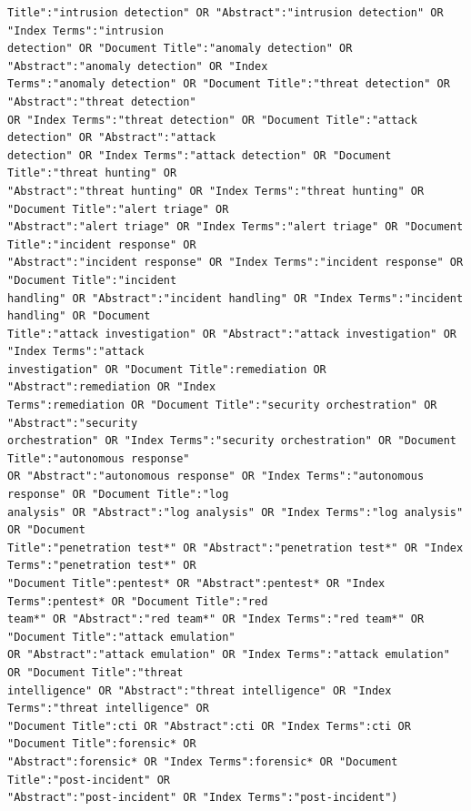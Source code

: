 \begin{lstlisting}
Title":"intrusion detection" OR "Abstract":"intrusion detection" OR "Index Terms":"intrusion
detection" OR "Document Title":"anomaly detection" OR "Abstract":"anomaly detection" OR "Index
Terms":"anomaly detection" OR "Document Title":"threat detection" OR "Abstract":"threat detection"
OR "Index Terms":"threat detection" OR "Document Title":"attack detection" OR "Abstract":"attack
detection" OR "Index Terms":"attack detection" OR "Document Title":"threat hunting" OR
"Abstract":"threat hunting" OR "Index Terms":"threat hunting" OR "Document Title":"alert triage" OR
"Abstract":"alert triage" OR "Index Terms":"alert triage" OR "Document Title":"incident response" OR
"Abstract":"incident response" OR "Index Terms":"incident response" OR "Document Title":"incident
handling" OR "Abstract":"incident handling" OR "Index Terms":"incident handling" OR "Document
Title":"attack investigation" OR "Abstract":"attack investigation" OR "Index Terms":"attack
investigation" OR "Document Title":remediation OR "Abstract":remediation OR "Index
Terms":remediation OR "Document Title":"security orchestration" OR "Abstract":"security
orchestration" OR "Index Terms":"security orchestration" OR "Document Title":"autonomous response"
OR "Abstract":"autonomous response" OR "Index Terms":"autonomous response" OR "Document Title":"log
analysis" OR "Abstract":"log analysis" OR "Index Terms":"log analysis" OR "Document
Title":"penetration test*" OR "Abstract":"penetration test*" OR "Index Terms":"penetration test*" OR
"Document Title":pentest* OR "Abstract":pentest* OR "Index Terms":pentest* OR "Document Title":"red
team*" OR "Abstract":"red team*" OR "Index Terms":"red team*" OR "Document Title":"attack emulation"
OR "Abstract":"attack emulation" OR "Index Terms":"attack emulation" OR "Document Title":"threat
intelligence" OR "Abstract":"threat intelligence" OR "Index Terms":"threat intelligence" OR
"Document Title":cti OR "Abstract":cti OR "Index Terms":cti OR "Document Title":forensic* OR
"Abstract":forensic* OR "Index Terms":forensic* OR "Document Title":"post-incident" OR
"Abstract":"post-incident" OR "Index Terms":"post-incident")
\end{lstlisting}
